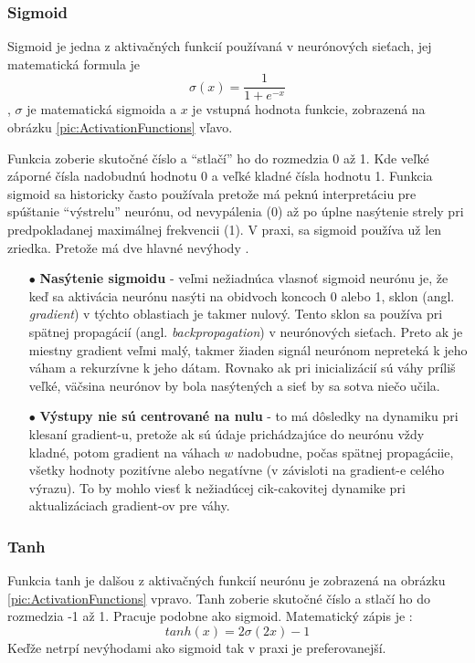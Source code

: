 \subsubsection{Sigmoid}
Sigmoid je jedna z aktivačných funkcií používaná v neurónových sieťach, jej matematická formula je
\begin{equation}
    \sigma(x) = \frac{1}{1 + e^{-x}}
\end{equation}
, $\sigma$ je matematická sigmoida a $x$ je vstupná hodnota funkcie, zobrazená na obrázku \ref{pic:ActivationFunctions} vľavo.

Funkcia zoberie skutočné číslo a ``stlačí'' ho do rozmedzia 0 až 1.
Kde veľké záporné čísla nadobudnú hodnotu 0 a veľké kladné čísla hodnotu 1.
Funkcia sigmoid sa historicky často používala pretože má peknú interpretáciu pre spúštanie ``výstrelu'' neurónu,
    od nevypálenia (0) až po úplne nasýtenie strely pri predpokladanej maximálnej frekvencii (1).
V praxi, sa sigmoid používa už len zriedka.
Pretože má dve hlavné nevýhody \cite{odkaz:ConvolutionalNeuralNetworkCS231n}.
\begin{enumerate}
    \item[$\bullet$] \textbf{Nasýtenie sigmoidu} - veľmi nežiadnúca vlasnoť sigmoid neurónu je, že keď sa aktivácia neurónu nasýti na obidvoch koncoch 0 alebo 1, sklon (angl. \textit{gradient}) v týchto oblastiach je takmer nulový.
    Tento sklon sa používa pri spätnej propagácií (angl. \textit{backpropagation}) v neurónových sieťach. Preto ak je miestny gradient veľmi malý, takmer žiaden signál
    neurónom nepreteká k jeho váham a rekurzívne k jeho dátam. Rovnako ak pri inicializácií sú váhy príliš veľké, väčsina neurónov by bola nasýtených a sieť by sa sotva niečo učila.
    \item[$\bullet$] \textbf{Výstupy nie sú centrované na nulu} - to má dôsledky na dynamiku pri klesaní gradient-u, pretože ak sú údaje prichádzajúce do neurónu vždy kladné,
    potom gradient na váhach $w$ nadobudne, počas spätnej propagáciie, všetky hodnoty pozitívne alebo negatívne (v závisloti na gradient-e celého výrazu).
    To by mohlo viesť k nežiadúcej cik-cakovitej dynamike pri aktualizáciach gradient-ov pre váhy.
\end{enumerate}


\subsubsection{Tanh}
Funkcia tanh je dalšou z aktivačných funkcií neurónu je zobrazená na obrázku \ref{pic:ActivationFunctions} vpravo.
Tanh zoberie skutočné číslo a stlačí ho do rozmedzia -1 až 1. Pracuje podobne ako sigmoid.
Matematický zápis je \cite{odkaz:ConvolutionalNeuralNetworkCS231n}:
\begin{equation}
    tanh(x) = 2\sigma(2x) - 1
\end{equation}
Keďže netrpí nevýhodami ako sigmoid tak v praxi je preferovanejší.


